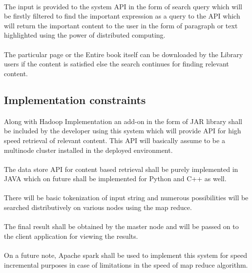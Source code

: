 \paragraph{} The input is provided to the system API in the form of search query which will be firstly filtered to find the important expression as a query to the API which will return the important content to the user in the form of paragraph or text highlighted using the power of distributed computing.
\paragraph{} The particular page or the Entire book itself can be downloaded by the Library users if the content is satisfied else the search continues for finding relevant content.

\subsection{Implementation constraints}
\paragraph{} Along with Hadoop Implementation an add-on in the form of JAR library shall be included by the developer using this system which will provide API for high speed retrieval of relevant content.  This API will basically assume to be a multinode cluster installed in the deployed environment.
\paragraph{} The data store API for content based retrieval shall be purely implemented in JAVA which on future shall be implemented for Python and C++ as well.
\paragraph{} There will be basic tokenization of input string and numerous possibilities will be searched distributively on various nodes using the map reduce.
\paragraph{} The final result shall be obtained by the master node and will be passed on to the client application for viewing the results.
\paragraph{} On a future note, Apache spark shall be used to implement this system for speed incremental purposes in case of limitations in the speed of map reduce algorithm.


